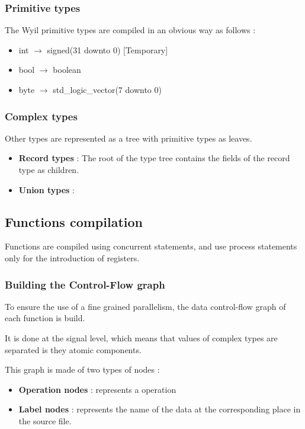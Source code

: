 \documentclass[10pt,a4paper]{article}
\begin{document}
\subsubsection{Primitive types}

The Wyil primitive types are compiled in an obvious way as follows :

\begin{itemize}
	\item int $\longrightarrow$ signed(31 downto 0) [Temporary]
	\item bool $\longrightarrow$ boolean
	\item byte $\longrightarrow$ std\_logic\_vector(7 downto 0) 
\end{itemize}

\subsubsection{Complex types}

Other types are represented as a tree with primitive types as leaves.

\begin{itemize}
	\item \textbf{Record types} : The root of the type tree contains the fields of the record type as children.
	\item \textbf{Union types} :
\end{itemize}

\subsection{Functions compilation}

Functions are compiled using concurrent statements, and use process statements only for the introduction of registers. 

\subsubsection{Building the Control-Flow graph}

To ensure the use of a fine grained parallelism, the data control-flow graph of each function is build.

It is done at the signal level, which means that values of complex types are separated is they atomic components.

This graph is made of two types of nodes : 
\begin{itemize}
	\item \textbf{Operation nodes} : represents a operation
	\item \textbf{Label nodes} : represents the name of the data at the corresponding place in the source file.
\end{itemize}
\end{document}
